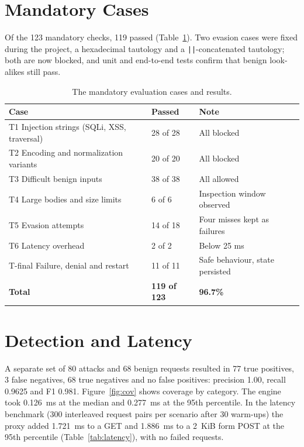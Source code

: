 \documentclass{FastFyp}
\newenvironment{rtab}{\small\singlespacing\renewcommand{\arraystretch}{1.3}}{}
\begin{document}
\section{Mandatory Cases}
Of the 123 mandatory checks, 119 passed (Table~\ref{tab:cases}). Two evasion cases were fixed during the project, a hexadecimal tautology and a \texttt{||}-concatenated tautology; both are now blocked, and unit and end-to-end tests confirm that benign look-alikes still pass.

\begin{table}[!htb]
\centering
\caption{The mandatory evaluation cases and results.}
\begin{rtab}
\begin{tabular}{|p{6.2cm}|p{2.6cm}|p{4.7cm}|}
\hline
\textbf{Case} & \textbf{Passed} & \textbf{Note} \\
\hline
T1 Injection strings (SQLi, XSS, traversal) & 28 of 28 & All blocked \\
\hline
T2 Encoding and normalization variants & 20 of 20 & All blocked \\
\hline
T3 Difficult benign inputs & 38 of 38 & All allowed \\
\hline
T4 Large bodies and size limits & 6 of 6 & Inspection window observed \\
\hline
T5 Evasion attempts & 14 of 18 & Four misses kept as failures \\
\hline
T6 Latency overhead & 2 of 2 & Below 25 ms \\
\hline
T-final Failure, denial and restart & 11 of 11 & Safe behaviour, state persisted \\
\hline
\textbf{Total} & \textbf{119 of 123} & \textbf{96.7\%} \\
\hline
\end{tabular}
\end{rtab}
\label{tab:cases}
\end{table}

\section{Detection and Latency}
A separate set of 80 attacks and 68 benign requests resulted in 77 true positives, 3 false negatives, 68 true negatives and no false positives: precision 1.00, recall 0.9625 and F1 0.981. Figure~\ref{fig:cov} shows coverage by category. The engine took 0.126~ms at the median and 0.277~ms at the 95th percentile. In the latency benchmark (300 interleaved request pairs per scenario after 30 warm-ups) the proxy added 1.721~ms to a GET and 1.886~ms to a 2~KiB form POST at the 95th percentile (Table~\ref{tab:latency}), with no failed requests.
\end{document}
